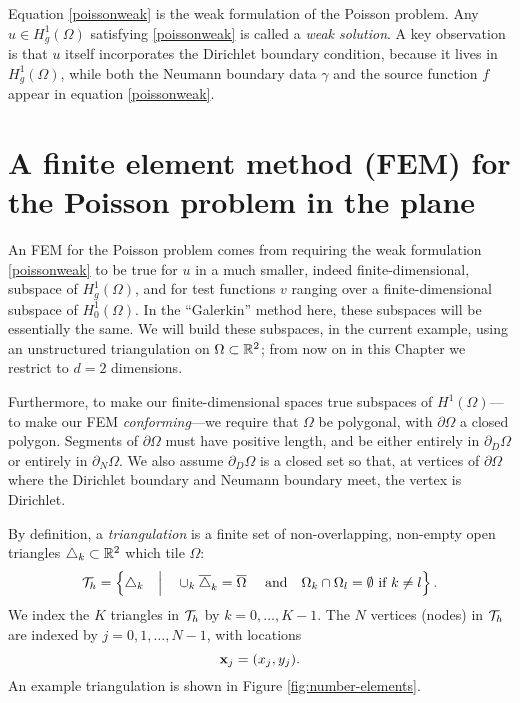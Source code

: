 Equation \eqref{poissonweak} is the weak formulation of the Poisson problem.  Any $u \in H_g^1(\Omega)$ satisfying \eqref{poissonweak} is called a \emph{weak solution}.  A key observation is that $u$ itself incorporates the Dirichlet boundary condition, because it lives in $H_g^1(\Omega)$, while both the Neumann boundary data $\gamma$ and the source function $f$ appear in equation \eqref{poissonweak}.


\section{A finite element method (FEM) for the Poisson problem in the plane}

An FEM for the Poisson problem comes from requiring the weak formulation \eqref{poissonweak} to be true for $u$ in a much smaller, indeed finite-dimensional, subspace of $H_g^1(\Omega)$, and for test functions $v$ ranging over a finite-dimensional subspace of $H_0^1(\Omega)$.  In the ``Galerkin'' method here, these subspaces will be essentially the same.  We will build these subspaces, in the current example, using an unstructured triangulation on $\Omega\subset \mathbb{R}^2$; from now on in this Chapter we restrict to $d=2$ dimensions.

Furthermore, to make our finite-dimensional spaces true subspaces of $H^1(\Omega)$---to make our FEM \emph{conforming}---we require that $\Omega$ be polygonal, with $\partial\Omega$ a closed polygon.  Segments of $\partial\Omega$ must have positive length, and be either entirely in $\partial_D\Omega$ or entirely in $\partial_N\Omega$.  We also assume $\partial_D\Omega$ is a closed set so that, at vertices of $\partial \Omega$ where the Dirichlet boundary and Neumann boundary meet, the vertex is Dirichlet.

By definition, a \emph{triangulation} is a finite set of non-overlapping, non-empty open triangles $\triangle_k\subset \mathbb{R}^2$ which tile $\Omega$:
\begin{equation*}
\mathcal{T}_h = \left\{\triangle_k \quad\Big|\quad \cup_k \overline{\triangle}_k = \overline{\Omega} \quad \text{ and} \quad \Omega_k \cap \Omega_l = \emptyset \text{ if } k\ne l\right\}.
\end{equation*}
We index the $K$ triangles in $\mathcal{T}_h$ by $k=0,\dots,K-1$.  The $N$ vertices (nodes) in $\mathcal{T}_h$ are indexed by $j=0,1,\dots,N-1$, with locations
\begin{equation*}
\mathbf{x}_j = (x_j,y_j).
\end{equation*}
An example triangulation is shown in Figure \ref{fig:number-elements}.

